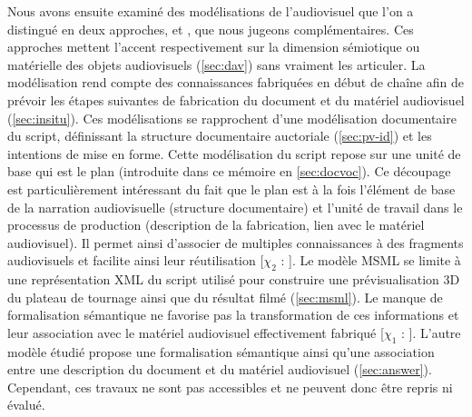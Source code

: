 Nous avons ensuite examiné des modélisations de l'audiovisuel que l'on a distingué en deux approches,  et , que nous jugeons complémentaires. 
Ces approches mettent l'accent respectivement sur la dimension sémiotique ou matérielle des objets audiovisuels (\ref{sec:dav}) sans vraiment les articuler.
La modélisation  rend compte des connaissances fabriquées en début de chaîne afin de prévoir les étapes suivantes de fabrication du document et du matériel audiovisuel (\ref{sec:insitu}).
Ces modélisations se rapprochent d'une modélisation documentaire du script, définissant la structure documentaire auctoriale (\ref{sec:pv-id}) et les intentions de mise en forme.
Cette modélisation du script repose sur une unité de base qui est le plan (introduite dans ce mémoire en \ref{sec:docvoc}).
Ce découpage est particulièrement intéressant du fait que le plan est à la fois l'élément de base de la narration audiovisuelle (structure documentaire) et l'unité de travail dans le processus de production (description de la fabrication, lien avec le matériel audiovisuel). 
Il permet ainsi d'associer de multiples connaissances à des fragments audiovisuels et facilite ainsi leur réutilisation [$\chi_2$ : ].
Le modèle MSML se limite à une représentation XML du script utilisé pour construire une prévisualisation 3D du plateau de tournage ainsi que du résultat filmé (\ref{sec:msml}). 
Le manque de formalisation sémantique ne favorise pas la transformation de ces informations et leur association avec le matériel audiovisuel effectivement fabriqué [$\chi_1$ : ].
L'autre modèle étudié propose une formalisation sémantique ainsi qu'une association entre une description du document et du matériel audiovisuel (\ref{sec:answer}).
Cependant, ces travaux ne sont pas accessibles et ne peuvent donc être repris ni évalué.

